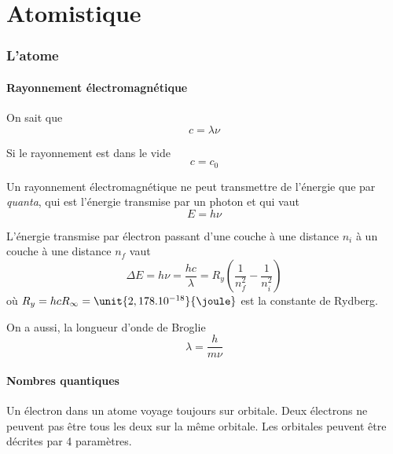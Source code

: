\documentclass[11pt,a4paper,french]{article}
\begin{document}
\part{Atomistique}

\section{L'atome}



\subsection{Rayonnement électromagnétique}

On sait que
\[ c = \lambda \nu \]

Si le rayonnement est dans le vide
\[ c = c_0 \]

Un rayonnement électromagnétique ne peut transmettre de l'énergie que par {\it quanta}, qui est l'énergie transmise par un photon et qui vaut
\[ E = h\nu \]

L'énergie transmise par électron passant d'une couche à une distance $n_i$ à un couche à une distance $n_f$ vaut
\[ \Delta E = h\nu = \frac{hc}{\lambda} = R_y \left( \frac{1}{n_f^2} - \frac{1}{n_i^2} \right) \]
où $R_y = hc R_\infty = \unit{2,178 . 10^{-18}}{\joule}$ est la constante de Rydberg.

On a aussi, la longueur d'onde de Broglie
\[ \lambda = \frac{h}{m\nu} \]

\subsection{Nombres quantiques}

Un électron dans un atome voyage toujours sur orbitale.
Deux électrons ne peuvent pas être tous les deux sur la même orbitale.
Les orbitales peuvent être décrites par 4 paramètres.
\end{document}
